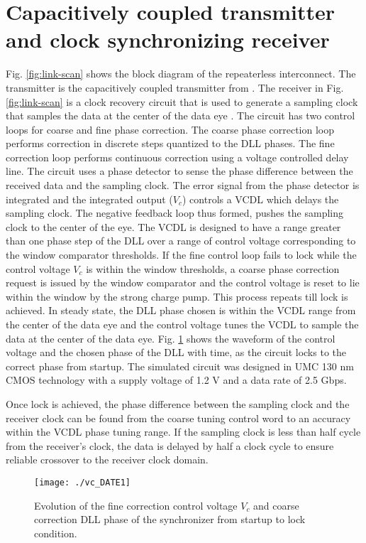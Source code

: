 \documentclass[conference]{IEEEtran}
\begin{document}
\section{Capacitively coupled transmitter and clock synchronizing receiver}
Fig. \ref{fig:link-scan} shows the block diagram of the repeaterless interconnect.
The transmitter is the capacitively coupled transmitter from \cite{naveen_vlsi13}.
The receiver in Fig. \ref{fig:link-scan} is a clock recovery circuit
that is used to generate a sampling clock that samples the data at the
center of the data eye \cite{naveen-arxiv15}. 
The circuit has two control loops for coarse and fine phase 
correction. The coarse phase correction loop performs correction in 
discrete steps quantized to the DLL phases. The fine correction loop performs
continuous correction using a voltage controlled delay line.
The circuit uses a phase detector to sense the
phase difference between the received data and the sampling clock. The error
signal from the phase detector is integrated and the integrated output ($V_c$)
controls a VCDL which delays the sampling clock.
The negative feedback loop thus formed, pushes the sampling clock to the 
center of the eye. The VCDL is designed to have a range greater than one
phase step of the DLL over a range of control voltage corresponding to
the window comparator thresholds.
If the fine control loop fails to lock while the control voltage
$V_c$ is within the window thresholds, a coarse phase correction request
is issued by the window comparator and the control voltage is reset to 
lie within the window by the strong charge pump. This process repeats
till lock is achieved. In steady state, the DLL phase chosen is within
the VCDL range from the center of the data eye and the control
voltage tunes the VCDL to sample the data at the center of the data eye.
Fig. \ref{fig:results} shows the waveform of the control voltage and 
the chosen phase of the DLL with time,  
as the circuit locks to the correct phase from startup.
The simulated circuit was designed in UMC 130 nm CMOS technology with 
a supply voltage of 1.2 V and a data rate of 2.5 Gbps.

Once lock is achieved,
the phase difference between the sampling clock and the receiver clock
can be found from the coarse tuning control word to an accuracy within the
VCDL phase tuning range. If the sampling clock is less than half cycle
from the receiver's clock, the data is delayed by half a clock cycle 
to ensure reliable crossover to the receiver clock domain.

\begin{figure}[h]
\centering
{}
\texttt{[image: ./vc\_DATE1]}\label{fig:Vc_alex}
\caption{Evolution of the fine correction control voltage $V_c$ 
and coarse correction DLL phase of the synchronizer from startup to 
lock condition.}
\label{fig:results}
\end{figure}
\end{document}
